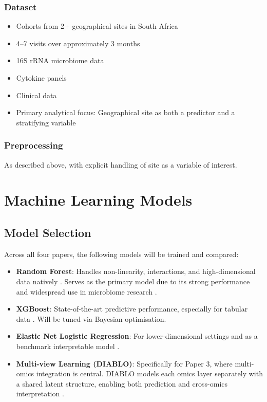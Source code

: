 \documentclass[12pt,a4paper]{report}
\begin{document}
\subsubsection{Dataset}
\begin{itemize}
    \item Cohorts from 2+ geographical sites in South Africa
    \item 4--7 visits over approximately 3 months
    \item 16S rRNA microbiome data
    \item Cytokine panels
    \item Clinical data
    \item Primary analytical focus: Geographical site as both a predictor and a stratifying variable
\end{itemize}

\subsubsection{Preprocessing}
As described above, with explicit handling of site as a variable of interest.

\section{Machine Learning Models}

\subsection{Model Selection}

Across all four papers, the following models will be trained and compared:

\begin{itemize}
    \item \textbf{Random Forest}: Handles non-linearity, interactions, and high-dimensional data natively \cite{breiman2001}. Serves as the primary model due to its strong performance and widespread use in microbiome research \cite{statnikov2013comprehensive}.
    \item \textbf{XGBoost}: State-of-the-art predictive performance, especially for tabular data \cite{chen2016xgboost}. Will be tuned via Bayesian optimisation.
    \item \textbf{Elastic Net Logistic Regression}: For lower-dimensional settings and as a benchmark interpretable model \cite{friedman2010}.
    \item \textbf{Multi-view Learning (DIABLO)}: Specifically for Paper 3, where multi-omics integration is central. DIABLO models each omics layer separately with a shared latent structure, enabling both prediction and cross-omics interpretation \cite{singh2019}.
\end{itemize}
\end{document}
